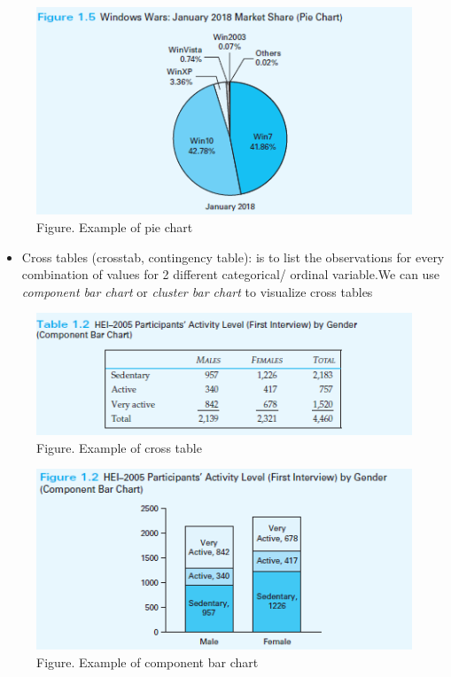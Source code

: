 \documentclass[
]{article}
\providecommand{\tightlist}{%
  \setlength{\itemsep}{0pt}\setlength{\parskip}{0pt}}
\begin{document}
\begin{figure}
\centering
\includegraphics{assets/image/C1-piecharttodescriberelativefrequencydistribution.PNG}
\caption{Figure. Example of pie chart}
\end{figure}

\begin{itemize}
\tightlist
\item
  Cross tables (crosstab, contingency table): is to list the
  observations for every combination of values for 2 different
  categorical/ ordinal variable.We can use \emph{component bar chart} or
  \emph{cluster bar chart} to visualize cross tables
\end{itemize}

\begin{figure}
\centering
\includegraphics{assets/image/C1-crosstab.PNG}
\caption{Figure. Example of cross table}
\end{figure}

\begin{figure}
\centering
\includegraphics{assets/image/C1-componentbarchart.PNG}
\caption{Figure. Example of component bar chart}
\end{figure}
\end{document}
